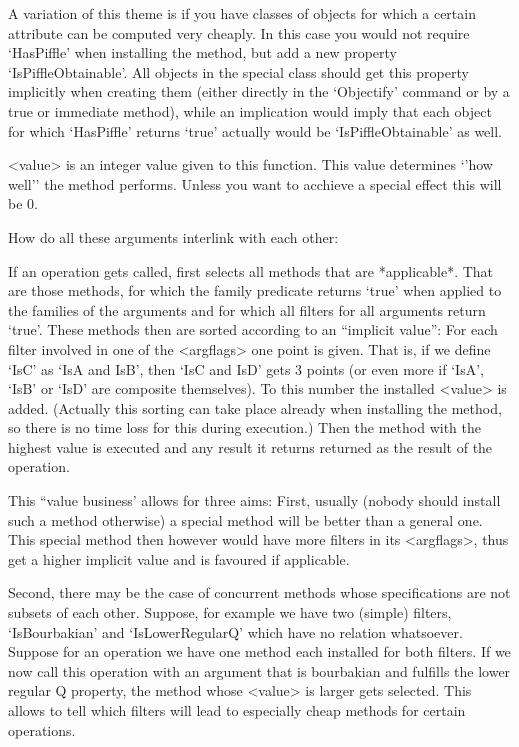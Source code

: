 \danger
A variation of this theme is if you have classes of objects for which
a certain attribute can be computed very cheaply. In this case you would not
require `HasPiffle' when installing the method, but add a new property
`IsPiffleObtainable'. All objects in the special class should get this
property implicitly when creating them (either directly in the `Objectify'
command or by a true or immediate method), while an implication would imply
that each object for which `HasPiffle' returns `true' actually would be
`IsPiffleObtainable' as well.

<value> is an integer value given to this function. This value determines
`'how well'' the method performs. Unless you want to acchieve a special
effect this will be 0.

How do all these arguments interlink with each other:

If an operation gets called, {\GAP} first selects all methods that are
*applicable*. That are those methods, for which the family predicate
returns `true' when applied to the families of the arguments and for which
all filters for all arguments return `true'. These methods then are sorted
according to an ``implicit value'': For each filter involved in one of the
<argflags> one point is given. That is, if we define `IsC' as `IsA and
IsB', then `IsC and IsD' gets 3 points (or even more if `IsA', `IsB' or
`IsD' are composite themselves).
To this number the installed <value> is
added.
(Actually this sorting can take place already when installing the method, so
there is no time loss for this during execution.)
Then the method with the highest value is executed and any result it returns
returned as the result of the operation.

This ``value business' allows for three aims: First, usually (nobody should
install such a method otherwise) a special method will be better than a
general one. This special method then however would have more filters in its 
<argflags>, thus get a higher implicit value and is favoured if applicable.

Second, there may be the case of concurrent methods whose specifications are
not subsets of each other. Suppose, for example we have two (simple) filters,
`IsBourbakian' and `IsLowerRegularQ' which have no relation whatsoever.
Suppose for an operation we have one method each installed for both filters.
If we now call this operation with an argument that is bourbakian and
fulfills the lower regular Q property, the method whose <value> is larger
gets selected. This allows to tell {\GAP} which filters will  lead to
especially cheap methods for certain operations.

